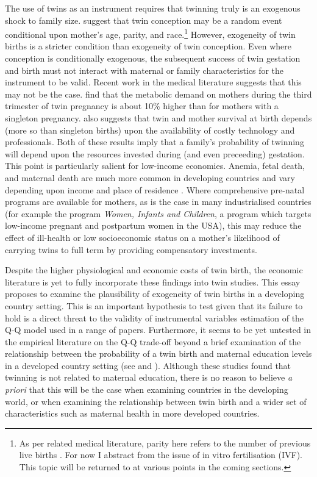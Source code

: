 \documentclass{article}[11pt,subeqn]
\begin{document}
\begin{spacing}{1.5}
The use of twins as an instrument requires that twinning truly is an exogenous shock to family size.  \citet{Kahnetal2003} suggest that twin conception may 
be a random event conditional upon mother's age, parity, and race.\footnote{As per related medical literature, parity here refers to the number of previous 
live births \citep{Elwood1978}. For now I abstract from the issue of in vitro fertilisation (IVF).  This topic will be returned to at various points in the coming 
sections.}  However, exogeneity of twin births is a stricter condition than exogeneity of twin conception.  Even where conception is conditionally exogenous, 
the subsequent success of twin gestation and birth must not interact with maternal or family characteristics for the instrument to be valid.  Recent work in 
the medical literature suggests that this may not be the case. \citet{Shinagawaetal2005} find that the metabolic demand on mothers during the third trimester 
of twin pregnancy is about 10\% higher than for mothers with a singleton pregnancy. \citet{Philipson2008} also suggests that twin and mother survival at 
birth depends (more so than singleton births) upon the availability of costly technology and professionals.  Both of these results imply that a family's 
probability of twinning will depend upon the resources invested during (and even preceeding) gestation.  This point is particularly salient for low-income 
economies.  Anemia, fetal death, and maternal death are much more common in developing countries and vary depending upon income and place of residence
 \citep{Rush2000}.  Where comprehensive pre-natal programs are available for mothers, as is the case in many industrialised countries (for example the 
program \emph{Women, Infants and Children}, a program which targets low-income pregnant and postpartum women in the USA), this may reduce the effect 
of ill-health or low socioeconomic status on a mother's likelihood of carrying twins to full term by providing compensatory investments.

Despite the higher physiological and economic costs of twin birth, the economic literature is yet to fully incorporate these findings into twin studies.  This 
essay proposes to examine the plausibility of exogeneity of twin births in a developing country setting.  This is an important hypothesis to test given that its 
failure to hold is a direct threat to the validity of instrumental variables estimation of the Q-Q model used in a range of papers.  Furthermore, it seems to be 
yet untested in the empirical literature on the Q-Q trade-off beyond a brief examination of the relationship between the probability of a twin birth and 
maternal education levels in a developed country setting (see \citet{Blacketal2005} and \citet{Angristetal2010}).  Although these studies found that twinning 
is not related to maternal education, there is no reason to believe \emph{a priori} that this will be the case when examining countries in the developing world, 
or when examining the relationship between twin birth and a wider set of characteristics such as maternal health in more developed countries. 


\end{spacing}
\end{document}
